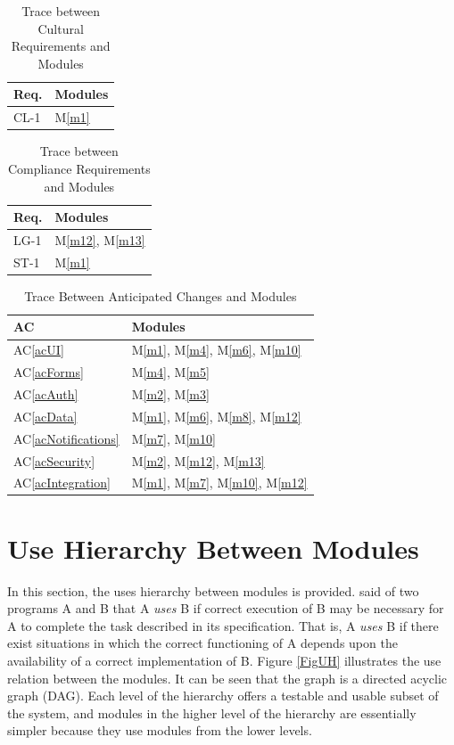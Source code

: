 \documentclass[12pt, titlepage]{article}
\newcommand{\acref}[1]{AC\ref{#1}}
\newcommand{\mref}[1]{M\ref{#1}}
\begin{document}
\begin{table}[H]
\centering
\begin{tabular}{p{} p{}}
\toprule
\textbf{Req.} & \textbf{Modules}\\
\midrule
CL-1 & \mref{m1} \\
\bottomrule
\end{tabular}
\caption{Trace between Cultural Requirements and Modules}
\label{TblRT_Cultural}
\end{table}

\begin{table}[H]
\centering
\begin{tabular}{p{} p{}}
\toprule
\textbf{Req.} & \textbf{Modules}\\
\midrule
LG-1 & \mref{m12}, \mref{m13} \\
ST-1 & \mref{m1} \\
\bottomrule
\end{tabular}
\caption{Trace between Compliance Requirements and Modules}
\label{TblRT_Compliance}
\end{table}

\begin{table}[H]
\centering
\begin{tabular}{p{} p{}}
\toprule
\textbf{AC} & \textbf{Modules}\\
\midrule
\acref{acUI} & \mref{m1}, \mref{m4}, \mref{m6}, \mref{m10}\\
\acref{acForms} & \mref{m4}, \mref{m5}\\
\acref{acAuth} & \mref{m2}, \mref{m3}\\
\acref{acData} & \mref{m1}, \mref{m6}, \mref{m8}, \mref{m12}\\
\acref{acNotifications} & \mref{m7}, \mref{m10}\\
\acref{acSecurity} & \mref{m2}, \mref{m12}, \mref{m13}\\
\acref{acIntegration} & \mref{m1}, \mref{m7}, \mref{m10}, \mref{m12}\\
\bottomrule
\end{tabular}
\caption{Trace Between Anticipated Changes and Modules}
\label{TblACT}
\end{table}

\section{Use Hierarchy Between Modules} \label{SecUse}

In this section, the uses hierarchy between modules is
provided. \citet{Parnas1978} said of two programs A and B that A {\em uses} B if
correct execution of B may be necessary for A to complete the task described in
its specification. That is, A {\em uses} B if there exist situations in which
the correct functioning of A depends upon the availability of a correct
implementation of B.  Figure \ref{FigUH} illustrates the use relation between
the modules. It can be seen that the graph is a directed acyclic graph
(DAG). Each level of the hierarchy offers a testable and usable subset of the
system, and modules in the higher level of the hierarchy are essentially simpler
because they use modules from the lower levels.
\end{document}
